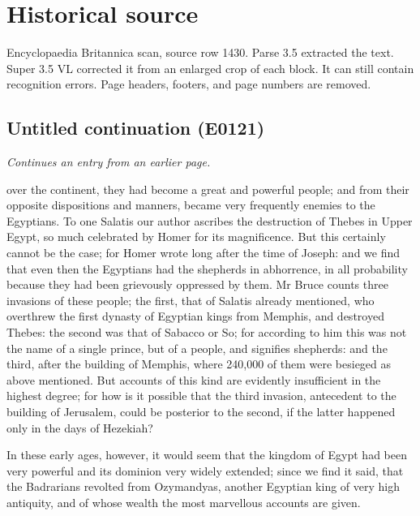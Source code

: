 \documentclass{article}
\begin{document}
\section*{Historical source}
Encyclopaedia Britannica scan, source row 1430. Parse 3.5 extracted the text. Super 3.5 VL corrected it from an enlarged crop of each block. It can still contain recognition errors.
Page headers, footers, and page numbers are removed.

\subsection*{Untitled continuation (E0121)}
\textit{Continues an entry from an earlier page.}

over the continent, they had become a great and powerful people; and from their opposite dispositions and manners, became very frequently enemies to the Egyptians. To one Salatis our author ascribes the destruction of Thebes in Upper Egypt, so much celebrated by Homer for its magnificence. But this certainly cannot be the case; for Homer wrote long after the time of Joseph: and we find that even then the Egyptians had the shepherds in abhorrence, in all probability because they had been grievously oppressed by them. Mr Bruce counts three invasions of these people; the first, that of Salatis already mentioned, who overthrew the first dynasty of Egyptian kings from Memphis, and destroyed Thebes: the second was that of Sabacco or So; for according to him this was not the name of a single prince, but of a people, and signifies shepherds: and the third, after the building of Memphis, where 240,000 of them were besieged as above mentioned. But accounts of this kind are evidently insufficient in the highest degree; for how is it possible that the third invasion, antecedent to the building of Jerusalem, could be posterior to the second, if the latter happened only in the days of Hezekiah?

In these early ages, however, it would seem that the kingdom of Egypt had been very powerful and its dominion very widely extended; since we find it said, that the Badrarians revolted from Ozymandyas, another Egyptian king of very high antiquity, and of whose wealth the most marvellous accounts are given.
\end{document}
